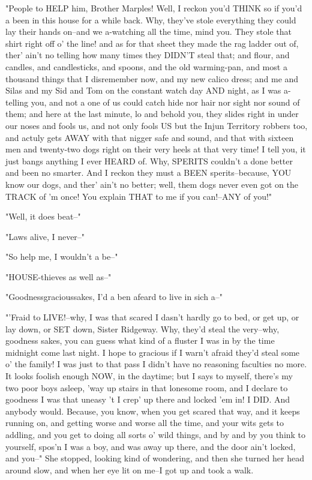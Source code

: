 "People to HELP him, Brother Marples!  Well, I reckon you'd THINK so if
you'd a been in this house for a while back.  Why, they've stole
everything they could lay their hands on--and we a-watching all the time,
mind you. They stole that shirt right off o' the line! and as for that
sheet they made the rag ladder out of, ther' ain't no telling how many
times they DIDN'T steal that; and flour, and candles, and candlesticks,
and spoons, and the old warming-pan, and most a thousand things that I
disremember now, and my new calico dress; and me and Silas and my Sid and
Tom on the constant watch day AND night, as I was a-telling you, and not
a one of us could catch hide nor hair nor sight nor sound of them; and
here at the last minute, lo and behold you, they slides right in under
our noses and fools us, and not only fools US but the Injun Territory
robbers too, and actuly gets AWAY with that nigger safe and sound, and
that with sixteen men and twenty-two dogs right on their very heels at
that very time!  I tell you, it just bangs anything I ever HEARD of.
Why, SPERITS couldn't a done better and been no smarter. And I reckon
they must a BEEN sperits--because, YOU know our dogs, and ther' ain't no
better; well, them dogs never even got on the TRACK of 'm once!  You
explain THAT to me if you can!--ANY of you!"

"Well, it does beat--"

"Laws alive, I never--"

"So help me, I wouldn't a be--"

"HOUSE-thieves as well as--"

"Goodnessgracioussakes, I'd a ben afeard to live in sich a--"

"'Fraid to LIVE!--why, I was that scared I dasn't hardly go to bed, or
get up, or lay down, or SET down, Sister Ridgeway.  Why, they'd steal the
very--why, goodness sakes, you can guess what kind of a fluster I was
in by the time midnight come last night.  I hope to gracious if I warn't
afraid they'd steal some o' the family!  I was just to that pass I didn't
have no reasoning faculties no more.  It looks foolish enough NOW, in the
daytime; but I says to myself, there's my two poor boys asleep, 'way up
stairs in that lonesome room, and I declare to goodness I was that uneasy
't I crep' up there and locked 'em in!  I DID.  And anybody would.
Because, you know, when you get scared that way, and it keeps running on,
and getting worse and worse all the time, and your wits gets to addling,
and you get to doing all sorts o' wild things, and by and by you think to
yourself, spos'n I was a boy, and was away up there, and the door ain't
locked, and you--" She stopped, looking kind of wondering, and then she
turned her head around slow, and when her eye lit on me--I got up and
took a walk.

